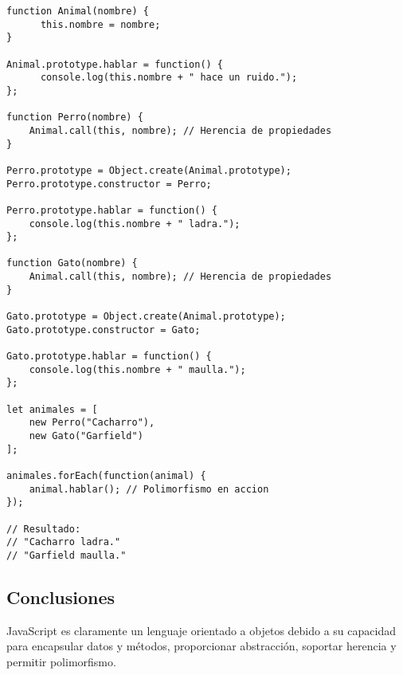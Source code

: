 \documentclass{article}
\begin{document}
\begin{lstlisting}
function Animal(nombre) {
      this.nombre = nombre;
}
      
Animal.prototype.hablar = function() {
      console.log(this.nombre + " hace un ruido.");
};

function Perro(nombre) {
    Animal.call(this, nombre); // Herencia de propiedades
}

Perro.prototype = Object.create(Animal.prototype);
Perro.prototype.constructor = Perro;

Perro.prototype.hablar = function() {
    console.log(this.nombre + " ladra.");
};

function Gato(nombre) {
    Animal.call(this, nombre); // Herencia de propiedades
}

Gato.prototype = Object.create(Animal.prototype);
Gato.prototype.constructor = Gato;

Gato.prototype.hablar = function() {
    console.log(this.nombre + " maulla.");
};

let animales = [
    new Perro("Cacharro"),
    new Gato("Garfield")
];

animales.forEach(function(animal) {
    animal.hablar(); // Polimorfismo en accion
});

// Resultado:
// "Cacharro ladra."
// "Garfield maulla."

\end{lstlisting}

\subsection{Conclusiones}

JavaScript es claramente un lenguaje orientado a objetos debido a su 
capacidad para encapsular datos y métodos, proporcionar abstracción, 
soportar herencia y permitir polimorfismo.
\end{document}
